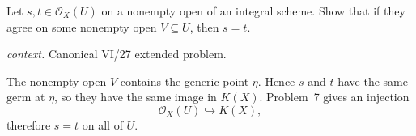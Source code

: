 \begin{problem}\label{prob:vi27-p08}
Let \(s,t\in\mathcal O_X(U)\) on a nonempty open of an integral scheme. Show that if they agree on some nonempty open \(V\subseteq U\), then \(s=t\).
\par\smallskip\noindent\textit{context.} Canonical VI/27 extended problem.
\end{problem}

\ifdefined\FullProblemDossiers
\begin{solution}
The nonempty open \(V\) contains the generic point \(\eta\). Hence \(s\) and \(t\) have the same germ at
\(\eta\), so they have the same image in \(K(X)\). Problem~7 gives an injection
\[
\mathcal O_X(U)\hookrightarrow K(X),
\]
therefore \(s=t\) on all of \(U\).
\end{solution}
\fi
